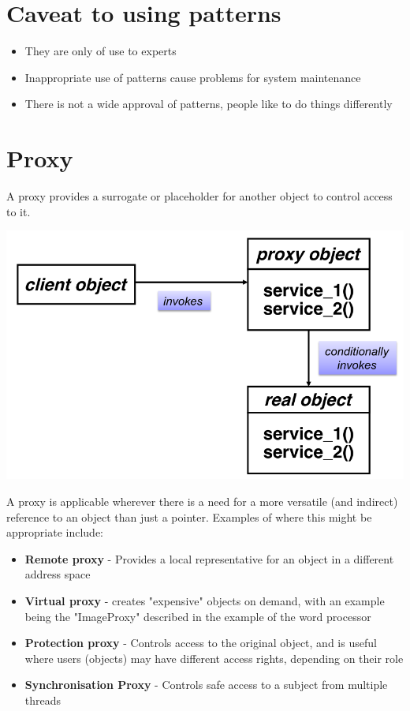 \documentclass{article}[18pt]
\begin{document}
\section{Caveat to using patterns}
\begin{itemize}
	\item They are only of use to experts
	\item Inappropriate use of patterns cause problems for system maintenance 
	\item There is not a wide approval of patterns, people like to do things differently
\end{itemize}
\section{Proxy}
A proxy provides a surrogate or placeholder for another object to control access to it. 
\begin{center}
	\includegraphics[scale=0.5]{Proxy}
\end{center}
A proxy is applicable wherever there is a need for a more versatile (and indirect) reference to an object than just a pointer. Examples of where this might be appropriate include:
\begin{itemize}
	\item \textbf{Remote proxy} - Provides a local representative for an object in a different address space
	\item \textbf{Virtual proxy} - creates "expensive" objects on demand, with an example being the "ImageProxy" described in the example of the word processor
	\item \textbf{Protection proxy} - Controls access to the original object, and is useful where users (objects) may have different access rights, depending on their role
	\item \textbf{Synchronisation Proxy} - Controls safe access to a subject from multiple threads
\end{itemize}
\end{document}
